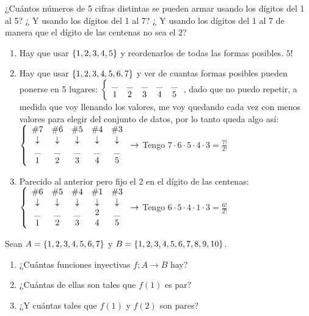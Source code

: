 \documentclass[12pt,a4paper, spanish]{article}
\begin{document}
\ejercicio
¿Cuántos números de 5 cifras distintas se pueden armar usando los dígitos del 1 al 5?
¿ Y usando los dígitos del 1 al 7? ¿ Y usando los dígitos del 1 al 7 de manera que el dígito de las centenas no sea el 2?
\begin{enumerate}[label=\arabic*)]
	\item Hay que usar $\set{1,2,3,4,5}$ y reordenarlos de todas las formas posibles. $5!$

	\item Hay que usar $\set{1,2,3,4,5,6,7}$ y ver de cuantas formas posibles pueden ponerse en 5 lugares:
	      $\llave{c c c c c}{
			      \_ & \_ & \_& \_& \_ \\
			      1 & 2 &3 &4 &5
		      }$, dado que no puedo repetir, a medida que voy llenando los valores, me voy quedando cada vez con menos valores
	      para elegir del conjunto de datos, por lo tanto queda algo así:
	      $\llave{c c c c c}{
			      \#7 & \#6 & \#5 & \#4 &\#3 \\
			      \downarrow &\downarrow &\downarrow &\downarrow &\downarrow\\
			      \_ & \_ & \_& \_& \_ \\
			      1 & 2 &3 &4 &5
		      }\to$ Tengo $7 \cdot 6 \cdot 5 \cdot 4 \cdot 3 = \frac{7!}{2!} $ 

	\item Parecido al anterior pero fijo el 2 en el dígito de las centenas:\\
	      $\llave{c c c c c}{
			      \#6 & \#5 & \#4 & \#1 &\#3 \\
			      \downarrow &\downarrow &\downarrow &\downarrow &\downarrow\\
			      \_ & \_ & \_& 2 & \_ \\
			      1 & 2 &3 &4 &5
		      }
		      \to $ Tengo $6 \cdot 5 \cdot 4 \cdot 1 \cdot 3 = \frac{6!}{2!} $ 
\end{enumerate}

\ejercicio
Sean $A = \set{1,2,3,4,5,6,7}$ y $B = \set{1,2,3,4,5,6,7,8,9,10}$.
\begin{enumerate}[label=\roman*)]
	\item ¿Cuántas funciones inyectivas $f; A \to B$ hay?
	\item ¿Cuántas de ellas son tales que $f(1)$ es par?
	\item ¿Y cuántas tales que $f(1)$ y $f(2)$ son pares?
\end{enumerate}

\separadorCorto
\end{document}
